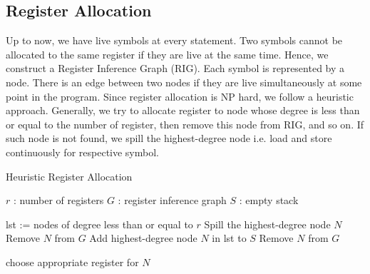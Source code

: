 \subsection{Register Allocation}
Up to now, we have live symbols at every statement. Two symbols cannot be allocated to the same register if they are live at the same time. Hence, we construct a Register Inference Graph (RIG). Each symbol is represented by a node. There is an edge between two nodes if they are live simultaneously at some point in the program. Since register allocation is NP hard, we follow a heuristic approach. Generally, we try to allocate register to node whose degree is less than or equal to the number of register, then remove this node from RIG, and so on. If such node is not found, we spill the highest-degree node i.e. load and store continuously for respective symbol.

\begin{algorithm}
  \caption{Heuristic Register Allocation}
  \begin{algorithmic}
    \STATE $r$ : number of registers
    \STATE $G$ : register inference graph
    \STATE $S$ : empty stack

    \STATE lst := nodes of degree less than or equal to $r$
    \STATE Spill the highest-degree node $N$
    \STATE Remove $N$ from $G$
    \ELSE
    \STATE Add highest-degree node $N$ in lst to $S$
    \STATE Remove $N$ from $G$
    \ENDIF
    \ENDWHILE

    \STATE choose appropriate register for $N$
    \ENDWHILE
  \end{algorithmic}
\end{algorithm}